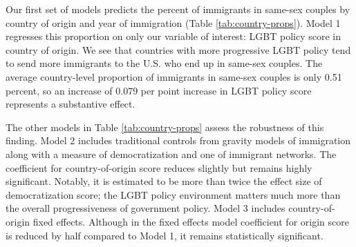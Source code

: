\documentclass[
  11pt,
]{article}
\begin{document}
Our first set of models predicts the percent of immigrants in same-sex couples by country of origin and year of immigration (Table \ref{tab:country-props}). Model 1 regresses this proportion on only our variable of interest: LGBT policy score in country of origin. We see that countries with more progressive LGBT policy tend to send more immigrants to the U.S. who end up in same-sex couples. The average country-level proportion of immigrants in same-sex couples is only 0.51 percent, so an increase of 0.079 per point increase in LGBT policy score represents a substantive effect.

The other models in Table \ref{tab:country-props} assess the robustness of this finding. Model 2 includes traditional controls from gravity models of immigration along with a measure of democratization and one of immigrant networks. The coefficient for country-of-origin score reduces slightly but remains highly significant. Notably, it is estimated to be more than twice the effect size of democratization score; the LGBT policy environment matters much more than the overall progressiveness of government policy. Model 3 includes country-of-origin fixed effects. Although in the fixed effects model coefficient for origin score is reduced by half compared to Model 1, it remains statistically significant.
\end{document}
